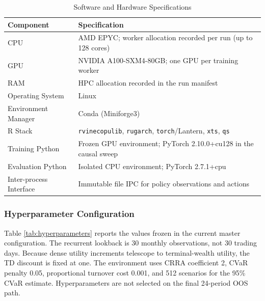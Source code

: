 \begin{table}[htbp]
\centering
\caption{Software and Hardware Specifications}
\label{tab:hardware}
\begin{tabular}{ll}
\toprule
\textbf{Component} & \textbf{Specification} \\
\midrule
CPU & AMD EPYC; worker allocation recorded per run (up to 128 cores) \\
GPU & NVIDIA A100-SXM4-80GB; one GPU per training worker \\
RAM & HPC allocation recorded in the run manifest \\
Operating System & Linux \\
Environment Manager & Conda (Miniforge3) \\
R Stack & \texttt{rvinecopulib}, \texttt{rugarch}, \texttt{torch}/Lantern, \texttt{xts}, \texttt{qs} \\
Training Python & Frozen GPU environment; PyTorch 2.10.0+cu128 in the causal sweep \\
Evaluation Python & Isolated CPU environment; PyTorch 2.7.1+cpu \\
Inter-process Interface & Immutable file IPC for policy observations and actions \\
\bottomrule
\end{tabular}
\end{table}

\subsubsection{Hyperparameter Configuration}
\label{subsubsec:3_hyperparameter_config}

Table \ref{tab:hyperparameters} reports the values frozen in the current master configuration. The recurrent lookback is 30 monthly observations, not 30 trading days. Because dense utility increments telescope to terminal-wealth utility, the TD discount is fixed at one. The environment uses CRRA coefficient 2, CVaR penalty 0.05, proportional turnover cost 0.001, and 512 scenarios for the 95\% CVaR estimate. Hyperparameters are not selected on the final 24-period OOS path.

